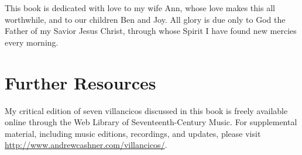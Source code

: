 This book is dedicated with love to my wife Ann, whose love makes this all
worthwhile, and to our children Ben and Joy.
All glory is due only to God the Father of my Savior Jesus Christ, through
whose Spirit I have found new mercies every morning.

\section*{Further Resources}

My critical edition of seven villancicos discussed in this book is freely
available online through the Web Library of Seventeenth-Century Music.%
    \Autocite{Cashner:WLSCM32}
For supplemental material, including music editions, recordings, and updates,
please visit \url{http://www.andrewcashner.com/villancicos/}.

\endinput

